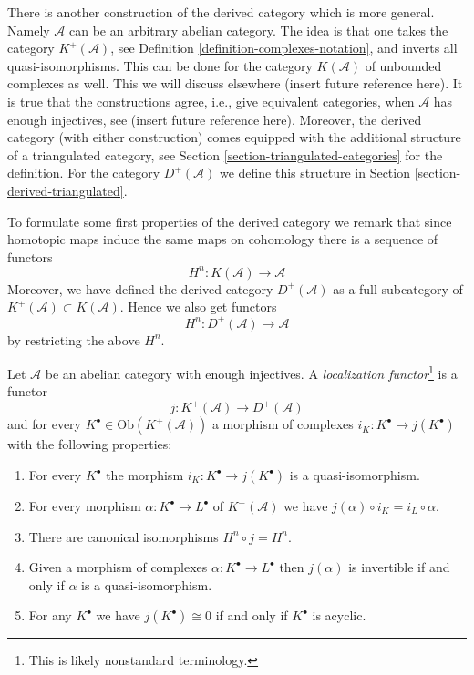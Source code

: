 \noindent
There is another construction of the derived category which is
more general. Namely $\mathcal{A}$ can be an arbitrary abelian
category. The idea is that one takes the category
$K^{+}(\mathcal{A})$, see Definition \ref{definition-complexes-notation},
and inverts all quasi-isomorphisms. This can be done for the category
$K(\mathcal{A})$ of
unbounded complexes as well. This we will discuss elsewhere
(insert future reference here). It is true that the constructions
agree, i.e., give equivalent categories, when $\mathcal{A}$ has enough
injectives, see (insert future reference here).
Moreover, the derived category (with either construction) comes equipped
with the additional structure of a triangulated category,
see Section \ref{section-triangulated-categories} for the definition.
For the category $D^{+}(\mathcal{A})$ we define this structure in
Section \ref{section-derived-triangulated}.

\medskip\noindent
To formulate some first properties of the derived category we remark that
since homotopic maps induce the same maps on cohomology there is a
sequence of functors
$$
H^n : K(\mathcal{A}) \longrightarrow \mathcal{A}
$$
Moreover, we have defined the derived category
$D^{+}(\mathcal{A})$ as a full subcategory
of $K^{+}(\mathcal{A}) \subset K(\mathcal{A})$. Hence we also get functors
$$
H^n : D^{+}(\mathcal{A}) \longrightarrow \mathcal{A}
$$
by restricting the above $H^n$.

\begin{definition}
\label{definition-localization-functor}
Let $\mathcal{A}$ be an abelian category with enough injectives.
A {\it localization functor}\footnote{This is likely nonstandard terminology.}
is a functor
$$
j : K^{+}(\mathcal{A}) \longrightarrow D^{+}(\mathcal{A})
$$
and for every $K^\bullet \in \text{Ob}(K^{+}(\mathcal{A}))$ a
morphism of complexes $i_K : K^\bullet \to j(K^\bullet)$
with the following properties:
\begin{enumerate}
\item For every $K^\bullet$ the morphism $i_K : K^\bullet \to j(K^\bullet)$
is a quasi-isomorphism.
\item For every morphism $\alpha : K^\bullet \to L^\bullet$ of
$K^{+}(\mathcal{A})$ we have $j(\alpha) \circ i_K = i_L \circ \alpha$.
\item There are canonical isomorphisms $H^n \circ j = H^n$.
\item Given a morphism of complexes $\alpha : K^\bullet \to L^\bullet$
then $j(\alpha)$ is invertible if and only if $\alpha$ is a
quasi-isomorphism.
\item For any $K^\bullet$ we have $j(K^\bullet) \cong 0$ if and only
if $K^\bullet$ is acyclic.
\end{enumerate}
\end{definition}


